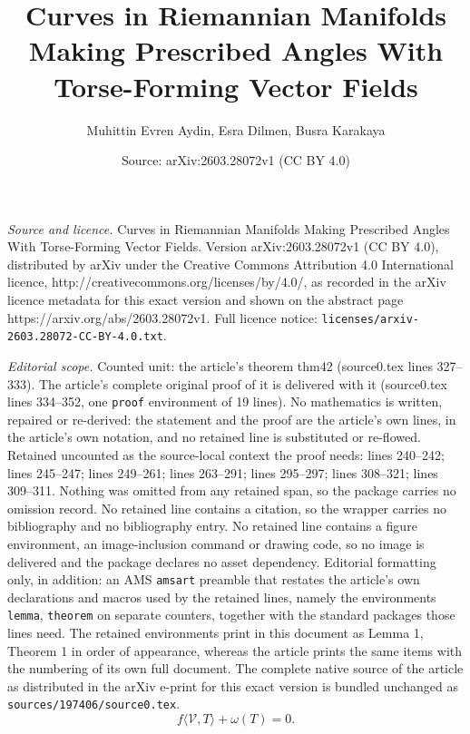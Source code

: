 \documentclass[10pt,a4paper]{amsart}
\title{Curves in Riemannian Manifolds Making Prescribed Angles With Torse-Forming Vector Fields}
\author{Muhittin Evren Aydin, Esra Dilmen, Busra Karakaya}
\date{Source: arXiv:2603.28072v1 (CC BY 4.0)}
\def\v{\mathcal V}
\begin{document}
\maketitle

\noindent\emph{Source and licence.} Curves in Riemannian Manifolds Making Prescribed Angles With Torse-Forming Vector Fields. Version arXiv:2603.28072v1 (CC BY 4.0), distributed by arXiv under the Creative Commons Attribution 4.0 International licence, http://creativecommons.org/licenses/by/4.0/, as recorded in the arXiv licence metadata for this exact version and shown on the abstract page https://arxiv.org/abs/2603.28072v1. Full licence notice: \texttt{licenses/arxiv-2603.28072-CC-BY-4.0.txt}.\par\smallskip

\noindent\textit{Editorial scope.} Counted unit: the article's theorem thm42 (source0.tex lines 327--333). The article's complete original proof of it is delivered with it (source0.tex lines 334--352, one \texttt{proof} environment of 19 lines). No mathematics is written, repaired or re-derived: the statement and the proof are the article's own lines, in the article's own notation, and no retained line is substituted or re-flowed.  Retained uncounted as the source-local context the proof needs: lines 240--242; lines 245--247; lines 249--261; lines 263--291; lines 295--297; lines 308--321; lines 309--311.  Nothing was omitted from any retained span, so the package carries no omission record.  No retained line contains a citation, so the wrapper carries no bibliography and no bibliography entry.  No retained line contains a figure environment, an image-inclusion command or drawing code, so no image is delivered and the package declares no asset dependency.  Editorial formatting only, in addition: an AMS \texttt{amsart} preamble that restates the article's own declarations and macros used by the retained lines, namely the environments \texttt{lemma}, \texttt{theorem} on separate counters, together with the standard packages those lines need.  The retained environments print in this document as Lemma 1, Theorem 1 in order of appearance, whereas the article prints the same items with the numbering of its own full document.  The complete native source of the article as distributed in the arXiv e-print for this exact version is bundled unchanged as \texttt{sources/197406/source0.tex}.
\begin{equation}
f\langle \v, T\rangle+\omega(T)=0. \label{cdimm}
\end{equation}
\end{document}
